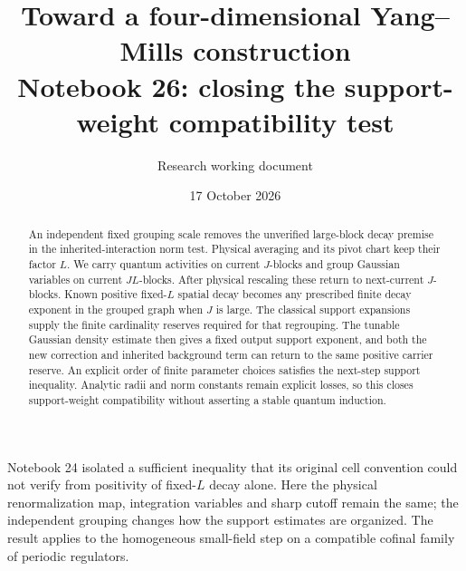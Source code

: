 \documentclass[11pt]{article}
\title{Toward a four-dimensional Yang--Mills construction\\
\large Notebook 26: closing the support-weight compatibility test}
\author{Research working document}
\date{17 October 2026}
\theoremstyle{remark}
\begin{document}
\maketitle
\begin{abstract}
An independent fixed grouping scale removes the unverified
large-block decay premise in the inherited-interaction norm
test. Physical averaging and its pivot chart keep their
factor $L$. We carry quantum activities on current $J$-blocks
and group Gaussian variables on current $JL$-blocks. After
physical rescaling these return to next-current $J$-blocks.
Known positive fixed-$L$ spatial decay becomes any prescribed
finite decay exponent in the grouped graph when $J$ is large.
The classical support expansions supply the finite cardinality
reserves required for that regrouping. The tunable Gaussian
density estimate then gives a fixed output support exponent,
and both the new correction and inherited background term
can return to the same positive carrier reserve.
An explicit order of finite parameter choices satisfies the
next-step support inequality. Analytic radii and norm constants
remain explicit losses, so this closes support-weight
compatibility without asserting a stable quantum induction.
\end{abstract}

Notebook 24 isolated a sufficient inequality that its original
cell convention could not verify from positivity of fixed-$L$
decay alone. Here the physical renormalization map, integration
variables and sharp cutoff remain the same; the independent
grouping changes how the support estimates are organized.
The result applies to the homogeneous small-field step on a
compatible cofinal family of periodic regulators.
\end{document}
